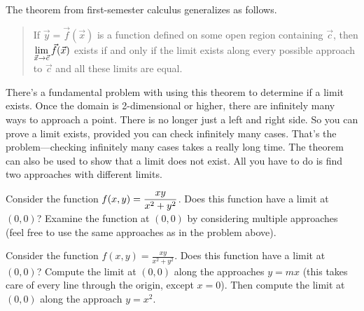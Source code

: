 The theorem from first-semester calculus generalizes as follows.
\begin{quote}
 If $\vec y=\vec f(\vec x)$ is a function defined on some open region containing $\vec c$, then $\displaystyle\lim_{\vec x\to \vec c}\vec f(\vec x)$ exists if and only if the limit exists along every possible approach to $\vec c$ and all these limits are equal.
\end{quote}
There's a fundamental problem with using this theorem to determine if a limit exists. Once the domain is 2-dimensional or higher, there are infinitely many ways to approach a point. There is no longer just a left and right side. So you can prove a limit exists, provided you can check infinitely many cases. That's the problem---checking infinitely many cases takes a really long time.  The theorem can also be used to show that a limit does not exist.  All you have to do is find two approaches with different limits.



\begin{problem}
%
%
 Consider the function $\displaystyle f(x,y) = \frac{xy}{x^2+y^2}$.  Does this function have a limit at $(0,0)$?  Examine the function at $(0,0)$ by considering multiple approaches (feel free to use the same approaches as in the problem above). 
\end{problem}

\begin{problem}
 Consider the function $f(x,y) = \frac{xy}{x^2+y^2}$.  Does this function have a limit at $(0,0)$?  Compute the limit at $(0,0)$ along the approaches $y=mx$ (this takes care of every line through the origin, except $x=0$).  Then compute the limit at $(0,0)$ along the approach $y=x^2$.
\end{problem}


